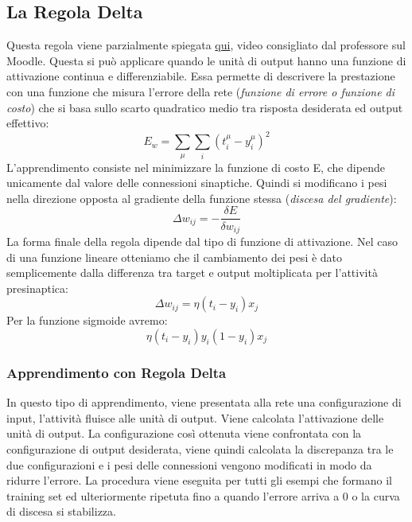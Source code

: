\subsection{La Regola Delta}
Questa regola viene parzialmente spiegata \href{https://www.youtube.com/watch?v=IHZwWFHWa-w}{qui}, video consigliato dal professore sul Moodle.
Questa si può applicare quando le unità di output hanno una funzione di attivazione continua e differenziabile. Essa permette di descrivere la prestazione con una funzione che misura l'errore della rete (\textit{funzione di errore o funzione di costo}) che si basa sullo scarto quadratico medio tra risposta desiderata ed output effettivo: \[E_w=\sum_\mu \sum_i (t^\mu_i-y^\mu_i)^2\]
L'apprendimento consiste nel minimizzare la funzione di costo E, che dipende unicamente dal valore delle connessioni sinaptiche. Quindi si modificano i pesi nella direzione opposta al gradiente della funzione stessa (\textit{discesa del gradiente}): \[\Delta w_{ij}= - \frac{\delta E}{\delta w_{ij}}\]
La forma finale della regola dipende dal tipo di funzione di attivazione. Nel caso di una funzione lineare otteniamo che il cambiamento dei pesi è dato semplicemente dalla differenza tra target e output moltiplicata per l'attività presinaptica: \[\Delta w_{ij}=\eta (t_i-y_i)x_j\]
Per la funzione sigmoide avremo: \[\eta (t_i-y_i)y_i(1-y_i)x_j\]

\subsubsection{Apprendimento con Regola Delta}
In questo tipo di apprendimento, viene presentata alla rete una configurazione di input, l'attività fluisce alle unità di output. Viene calcolata l'attivazione delle unità di output. La configurazione così ottenuta viene confrontata con la configurazione di output desiderata, viene quindi calcolata la discrepanza tra le due configurazioni e i pesi delle connessioni vengono modificati in modo da ridurre l'errore. La procedura viene eseguita per tutti gli esempi che formano il training set ed ulteriormente ripetuta fino a quando l'errore arriva a 0 o la curva di discesa si stabilizza.

